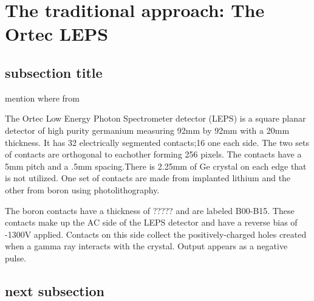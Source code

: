 \chapter{The traditional approach: The Ortec LEPS}
\label{ch:The traditional approach: The Ortec LEPS}
\section{subsection title}
\indent mention where from

The Ortec Low Energy Photon Spectrometer detector (LEPS) is a square planar detector of high purity germanium measuring 92mm by 92mm with a 20mm thickness. It has 32 electrically segmented contacts;16 one each side. The two sets of contacts are orthogonal to eachother forming 256 pixels. The contacts have a 5mm pitch and a .5mm spacing.There is 2.25mm of Ge crystal on each edge that is not utilized. One set of contacts are made from implanted lithium and the other from boron using photolithography. 

The boron contacts have a thickness of ????? and are labeled B00-B15. These contacts make up the AC side of the LEPS detector and have a reverse bias of -1300V applied. Contacts on this side collect the positively-charged holes created when a gamma ray interacts with the crystal. Output appears as a negative pulse. 

\section{next subsection}
\indent 




 


 